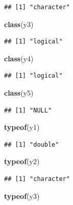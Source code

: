 \documentclass[
]{book}
\newenvironment{Shaded}{\begin{snugshade}}{\end{snugshade}}
\newcommand{\KeywordTok}[1]{\textcolor[rgb]{0.13,0.29,0.53}{\textbf{#1}}}
\newcommand{\NormalTok}[1]{#1}
\begin{document}
\begin{verbatim}
## [1] "character"
\end{verbatim}

\begin{Shaded}
\begin{Highlighting}[]
\KeywordTok{class}\NormalTok{(y3)}
\end{Highlighting}
\end{Shaded}

\begin{verbatim}
## [1] "logical"
\end{verbatim}

\begin{Shaded}
\begin{Highlighting}[]
\KeywordTok{class}\NormalTok{(y4)}
\end{Highlighting}
\end{Shaded}

\begin{verbatim}
## [1] "logical"
\end{verbatim}

\begin{Shaded}
\begin{Highlighting}[]
\KeywordTok{class}\NormalTok{(y5)}
\end{Highlighting}
\end{Shaded}

\begin{verbatim}
## [1] "NULL"
\end{verbatim}

\begin{Shaded}
\begin{Highlighting}[]
\KeywordTok{typeof}\NormalTok{(y1)}
\end{Highlighting}
\end{Shaded}

\begin{verbatim}
## [1] "double"
\end{verbatim}

\begin{Shaded}
\begin{Highlighting}[]
\KeywordTok{typeof}\NormalTok{(y2)}
\end{Highlighting}
\end{Shaded}

\begin{verbatim}
## [1] "character"
\end{verbatim}

\begin{Shaded}
\begin{Highlighting}[]
\KeywordTok{typeof}\NormalTok{(y3)}
\end{Highlighting}
\end{Shaded}
\end{document}

